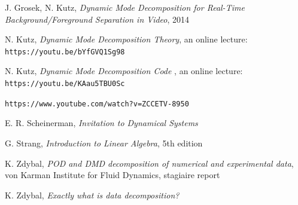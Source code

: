 \documentclass[10pt,twocolumn]{article}
\begin{document}
\thebibliography{}

 J. Grosek, N. Kutz, \textit{Dynamic Mode Decomposition for Real-Time Background/Foreground Separation in Video}, 2014

 N. Kutz, \textit{Dynamic Mode Decomposition Theory}, an online lecture: \verb|https://youtu.be/bYfGVQ1Sg98| \label{bib:kutz_1}

 N. Kutz, \textit{Dynamic Mode Decomposition Code }, an online lecture: \verb|https://youtu.be/KAau5TBU0Sc| \label{bib:kutz_2}

 \verb|https://www.youtube.com/watch?v=ZCCETV-8950| \label{bib:andymation}

 E. R. Scheinerman, \textit{Invitation to Dynamical Systems}

 G. Strang, \textit{Introduction to Linear Algebra}, 5th edition

 K. Zdybal, \textit{POD and DMD decomposition of numerical and experimental data}, von Karman Institute for Fluid Dynamics, stagiaire report 

 K. Zdybal, \textit{Exactly what is data decomposition?}
\end{document}
